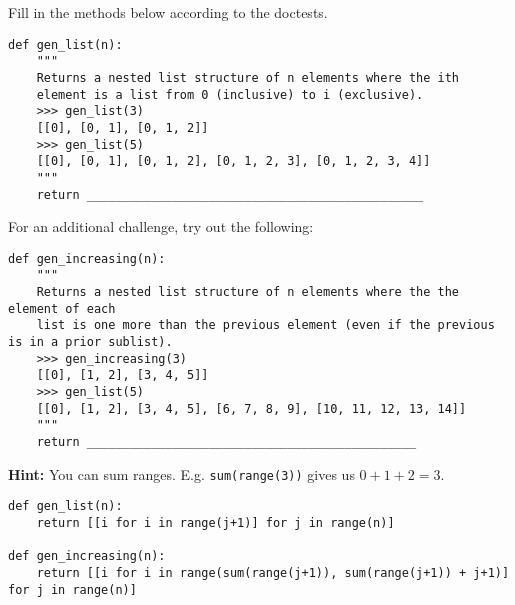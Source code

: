 \begin{blocksection}
\question Fill in the methods below according to the doctests.
\end{blocksection}

\begin{lstlisting}
def gen_list(n):
    """
    Returns a nested list structure of n elements where the ith
    element is a list from 0 (inclusive) to i (exclusive).
    >>> gen_list(3)
    [[0], [0, 1], [0, 1, 2]]
    >>> gen_list(5)
    [[0], [0, 1], [0, 1, 2], [0, 1, 2, 3], [0, 1, 2, 3, 4]]
    """
    return _______________________________________________
\end{lstlisting}

For an additional challenge, try out the following:

\begin{lstlisting}
def gen_increasing(n):
    """
    Returns a nested list structure of n elements where the the element of each 
    list is one more than the previous element (even if the previous is in a prior sublist).
    >>> gen_increasing(3)
    [[0], [1, 2], [3, 4, 5]]
    >>> gen_list(5)
    [[0], [1, 2], [3, 4, 5], [6, 7, 8, 9], [10, 11, 12, 13, 14]]
    """
    return ______________________________________________
\end{lstlisting}

\textbf{Hint:} You can sum ranges. E.g. \texttt{sum(range(3))} gives us $0 + 1 + 2 = 3$.

\begin{solution}
\begin{lstlisting}
def gen_list(n):
    return [[i for i in range(j+1)] for j in range(n)]

def gen_increasing(n):
	return [[i for i in range(sum(range(j+1)), sum(range(j+1)) + j+1)] for j in range(n)]
\end{lstlisting}
\end{solution}